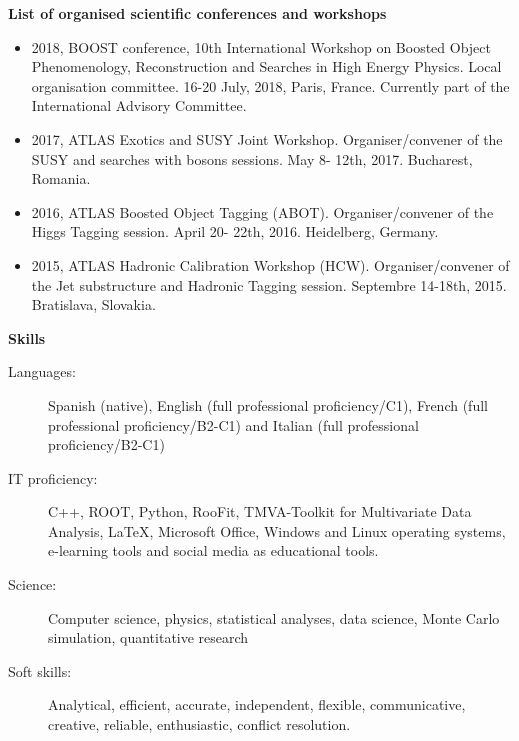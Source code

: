 \documentclass[letterpaper,10pt]{article}
\newcommand{\resheading}[1]{{\large \colorbox{mygrey}{\begin{minipage}{\textwidth}{\textbf{#1 \vphantom{p\^{E}}}}\end{minipage}}}}
\begin{document}

\noindent
\resheading{List of organised scientific conferences and workshops}

	\begin{itemize}
	        \item 2018, BOOST conference, 10th International Workshop on Boosted Object Phenomenology, Reconstruction and Searches in High Energy Physics. Local organisation committee. 16-20 July, 2018, Paris, France. Currently part of the International Advisory Committee. 
		\item 2017, ATLAS Exotics and SUSY Joint Workshop. Organiser/convener of the SUSY and searches with bosons sessions. May 8- 12th, 2017. Bucharest, Romania. 
		\item 2016, ATLAS Boosted Object Tagging (ABOT). Organiser/convener of the Higgs Tagging
session. April 20- 22th, 2016. Heidelberg, Germany.
		\item 2015, ATLAS Hadronic Calibration Workshop (HCW). Organiser/convener of the Jet
substructure and Hadronic Tagging session. Septembre 14-18th, 2015. Bratislava,
Slovakia.
	\end{itemize} %

\noindent
\resheading{Skills}
	\begin{description}
		\item[Languages:] { \footnotesize Spanish (native), English (full professional proficiency/C1), French (full professional proficiency/B2-C1) and Italian (full professional proficiency/B2-C1)
		}
		\item[IT proficiency:] { \footnotesize C++, ROOT, Python, RooFit, TMVA-Toolkit for Multivariate Data Analysis, LaTeX, Microsoft Office, Windows and Linux operating systems, e-learning tools and social media as educational tools.
		}
		\item[Science:] { \footnotesize
			Computer science, physics, statistical analyses, data science, Monte Carlo simulation, quantitative research
		}
		\item[Soft skills:] { \footnotesize
			Analytical, efficient, accurate, independent, flexible, communicative, creative, reliable, enthusiastic, conflict resolution.
		}
	\end{description} %
\end{document}
